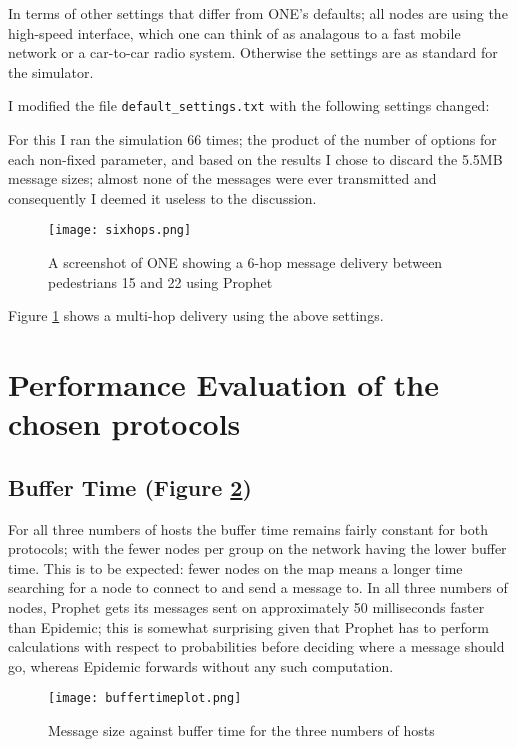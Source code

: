 \documentclass[12pt]{report}
\begin{document}
\par

In terms of other settings that differ from ONE's defaults; all nodes are using the high-speed interface, which one can think of as analagous to a fast mobile network or a car-to-car radio system.
Otherwise the settings are as standard for the simulator.

\par

I modified the file \verb|default_settings.txt| with the following settings changed:



For this I ran the simulation 66 times; the product of the number of options for each non-fixed parameter, and based on the results I chose to discard the 5.5MB message sizes; almost none of the messages were ever transmitted and consequently I deemed it useless to the discussion.

\begin{figure}[ht]
  \caption{A screenshot of ONE showing a 6-hop message delivery between pedestrians 15 and 22 using Prophet}
  \centering
  \texttt{[image: sixhops.png]}
  \label{fig:sixhops}
\end{figure}

Figure \ref{fig:sixhops} shows a multi-hop delivery using the above settings.

\section{Performance Evaluation of the chosen protocols}
\subsection{Buffer Time (Figure \ref{fig:buffertime})}
For all three numbers of hosts the buffer time remains fairly constant for both protocols; with the fewer nodes per group on the network having the lower buffer time.
This is to be expected: fewer nodes on the map means a longer time searching for a node to connect to and send a message to.
In all three numbers of nodes, Prophet gets its messages sent on approximately 50 milliseconds faster than Epidemic; this is somewhat surprising given that Prophet has to perform calculations with respect to probabilities before deciding where a message should go, whereas Epidemic forwards without any such computation.

\begin{figure}[ht]
  \caption{Message size against buffer time for the three numbers of hosts}
  \centering
  \texttt{[image: buffertimeplot.png]}
  \label{fig:buffertime}
\end{figure}
\end{document}
